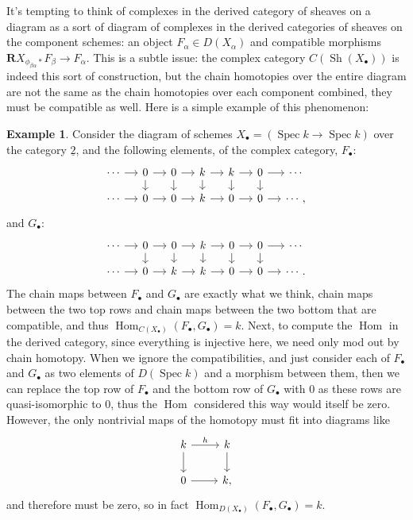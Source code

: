 \documentclass[proquest]{uwthesis}[2014/11/13]
\theoremstyle{definition}
\newtheorem{example}[theorem]{Example}
\DeclareMathOperator{\Hom}{Hom}
\DeclareMathOperator{\Sh}{Sh}
\DeclareMathOperator{\Spec}{Spec}
\newcommand{\bR}{\textbf{R}}
\newcommand{\tu}{\underline{2}}
\begin{document}
It's tempting to think of complexes in the derived category of sheaves on a diagram as a sort of diagram of complexes in the derived categories of sheaves on the component schemes: an object $F_\alpha \in D(X_\alpha)$ and compatible morphisms $\bR X_{\phi_{\beta \alpha} *} F_\beta \rightarrow F_\alpha$.
This is a subtle issue: the complex category $C(\Sh(X_\bullet))$ is indeed this sort of construction, but the chain homotopies over the entire diagram are not the same as the chain homotopies over each component combined, they must be compatible as well.
Here is a simple example of this phenomenon:
\begin{example}
	\label{ex:ddiagvsdiagd}
	Consider the diagram of schemes $X_\bullet = (\Spec k \rightarrow \Spec k)$ over the category $\tu$, and the following elements, of the complex category, $F_\bullet$:
	\[
		\begin{tikzcd}[column sep = small, row sep = small]
			\cdots \ar[r] & 0 \ar[r] \ar[d] & 0 \ar[r] \ar[d] & k \ar{r} \ar{d} & k \ar[r] \ar[d] & 0 \ar[r] \ar[d] & \cdots \\
			\cdots \ar[r] & 0 \ar[r] & 0 \ar[r] & k \ar[r] & 0 \ar[r] & 0 \ar[r] & \cdots,
		\end{tikzcd}
	\]
	and $G_\bullet$:
	\[
		\begin{tikzcd}[column sep = small, row sep = small]
			\cdots \ar[r] & 0 \ar[r] \ar[d] & 0 \ar[r] \ar[d] & k \ar[r] \ar[d] & 0 \ar[r] \ar[d] & 0 \ar[r] \ar[d] & \cdots \\
			\cdots \ar[r] & 0 \ar[r] & k \ar[r] & k \ar[r] & 0 \ar[r] & 0 \ar[r] & \cdots.
		\end{tikzcd}
	\]
	The chain maps between $F_\bullet$ and $G_\bullet$ are exactly what we think, chain maps between the two top rows and chain maps between the two bottom that are compatible, and thus $\Hom_{C(X_\bullet)}(F_\bullet, G_\bullet) = k$.
	Next, to compute the $\Hom$ in the derived category, since everything is injective here, we need only mod out by chain homotopy.
	When we ignore the compatibilities, and just consider each of $F_\bullet$ and $G_\bullet$ as two elements of $D(\Spec k)$ and a morphism between them, then we can replace the top row of $F_\bullet$ and the bottom row of $G_\bullet$ with 0 as these rows are quasi-isomorphic to 0, thus the $\Hom$ considered this way would itself be zero.
	However, the only nontrivial maps of the homotopy must fit into diagrams like
	\[
		\begin{tikzcd}
			k \arrow{r}{h} \ar[d] & k \ar[d] \\
			0 \ar[r] & k,
		\end{tikzcd}
	\]
	and therefore must be zero, so in fact $\Hom_{D(X_\bullet)}(F_\bullet, G_\bullet) = k$.
	

\end{example}
\end{document}
